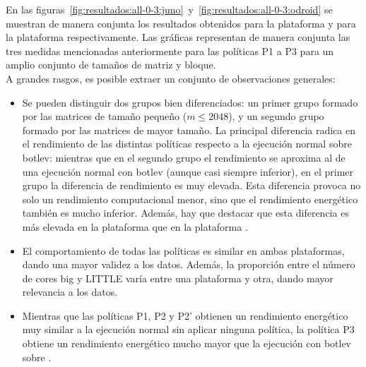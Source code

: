 En las
figuras~\ref{fig:resultados:all-0-3:juno}~y~\ref{fig:resultados:all-0-3:odroid}
se muestran de manera conjunta los resultados obtenidos para la plataforma
\juno y para la plataforma \odroid respectivamente. Las gráficas
representan de manera conjunta las tres medidas mencionadas anteriormente
para las políticas P1 a P3 para un amplio conjunto de tamaños de matriz y
bloque.\\
A grandes rasgos, es posible extraer un conjunto de observaciones
generales:
\begin{itemize}
\item Se pueden distinguir dos grupos bien diferenciados: un primer grupo
  formado por las matrices de tamaño pequeño ($m \le 2048$), y un segundo
  grupo formado por las matrices de mayor tamaño. La principal diferencia
  radica en el rendimiento de las distintas políticas respecto a la
  ejecución normal sobre botlev: mientras que en el segundo grupo el
  rendimiento se aproxima al de una ejecución normal con botlev (aunque
  casi siempre inferior), en el primer grupo la diferencia de rendimiento
  es muy elevada. Esta diferencia provoca no solo un rendimiento
  computacional menor, sino que el rendimiento energético también es mucho
  inferior. Además, hay que destacar que esta diferencia es más elevada en
  la plataforma \odroid que en la plataforma \juno.
\item El comportamiento de todas las políticas es similar en ambas
  plataformas, dando una mayor validez a los datos. Además, la proporción
  entre el número de cores big y LITTLE varía entre una plataforma y otra,
  dando mayor relevancia a los datos.
\item Mientras que las políticas P1, P2 y P2' obtienen un rendimiento
  energético muy similar a la ejecución normal sin aplicar ninguna
  política, la política P3 obtiene un rendimiento energético mucho mayor
  que la ejecución con botlev sobre \ompss.
\end{itemize}  

